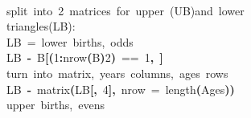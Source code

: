 \documentclass[a4paper]{article}
\newcommand{\hlnumber}[1]{\textcolor[rgb]{0.0823529411764706,0.0784313725490196,0.709803921568627}{#1}}%
\newcommand{\hlfunctioncall}[1]{\textcolor[rgb]{1,0,0}{#1}}%
\newcommand{\hlkeyword}[1]{\textcolor[rgb]{0,0,0}{\textbf{#1}}}%
\newcommand{\hlargument}[1]{\textcolor[rgb]{0.694117647058824,0.247058823529412,0.0196078431372549}{#1}}%
\newcommand{\hlcomment}[1]{\textcolor[rgb]{0.8,0.8,0.8}{#1}}%
\newcommand{\hlassignement}[1]{\textcolor[rgb]{0.215686274509804,0.215686274509804,0.384313725490196}{\textbf{#1}}}%
\newcommand{\hlsymbol}[1]{\textcolor[rgb]{0,0,0}{#1}}%
\newcommand{\hlprompt}[1]{\textcolor[rgb]{0,0,0}{#1}}%
\newcommand{\hlstd}[1]{\textcolor[rgb]{0,0,0}{#1}}%
\newenvironment{Houtput}{\raggedright}{%
%
}
\begin{document}
\begin{Houtput}
\hspace*{\fill}\\
\hlstd{}\ttfamily\noindent
\hlprompt{\usebox{\hlnormalsizeboxgreaterthan}{\ }}\hlcomment{\usebox{\hlnormalsizeboxhash}{\ }split{\ }into{\ }2{\ }matrices{\ }for{\ }upper{\ }(UB)and{\ }lower}\mbox{}
\normalfont
\hspace*{\fill}\\
\hlstd{}\ttfamily\noindent
\hlprompt{\usebox{\hlnormalsizeboxgreaterthan}{\ }}\hlcomment{\usebox{\hlnormalsizeboxhash}{\ }{\ }{\ }triangles(LB):}\mbox{}
\normalfont
\hspace*{\fill}\\
\hlstd{}\ttfamily\noindent
\hlprompt{\usebox{\hlnormalsizeboxgreaterthan}{\ }}\hlcomment{\usebox{\hlnormalsizeboxhash}{\ }LB{\ }={\ }lower{\ }births,{\ }odds}\mbox{}
\normalfont
\hspace*{\fill}\\
\hlstd{}\ttfamily\noindent
\hlprompt{\usebox{\hlnormalsizeboxgreaterthan}{\ }}\hlsymbol{LB}{\ }\hlassignement{\usebox{\hlnormalsizeboxlessthan}-}{\ }\hlsymbol{B}\hlkeyword{[}\hlkeyword{(}\hlnumber{1}\hlkeyword{:}\hlfunctioncall{nrow}\hlkeyword{(}\hlsymbol{B}\hlkeyword{)}\hlkeyword{\usebox{\hlnormalsizeboxpercent}\usebox{\hlnormalsizeboxpercent}}\hlnumber{2}\hlkeyword{)}{\ }=={\ }\hlnumber{1}\hlkeyword{,}{\ }\hlkeyword{]}\mbox{}
\normalfont
\hspace*{\fill}\\
\hlstd{}\ttfamily\noindent
\hlprompt{\usebox{\hlnormalsizeboxgreaterthan}{\ }}\hlcomment{\usebox{\hlnormalsizeboxhash}{\ }turn{\ }into{\ }matrix,{\ }years{\ }columns,{\ }ages{\ }rows}\mbox{}
\normalfont
\hspace*{\fill}\\
\hlstd{}\ttfamily\noindent
\hlprompt{\usebox{\hlnormalsizeboxgreaterthan}{\ }}\hlsymbol{LB}{\ }\hlassignement{\usebox{\hlnormalsizeboxlessthan}-}{\ }\hlfunctioncall{matrix}\hlkeyword{(}\hlsymbol{LB}\hlkeyword{[}\hlkeyword{,}{\ }\hlnumber{4}\hlkeyword{]}\hlkeyword{,}{\ }\hlargument{nrow}{\ }\hlargument{=}{\ }\hlfunctioncall{length}\hlkeyword{(}\hlsymbol{Ages}\hlkeyword{)}\hlkeyword{)}\mbox{}
\normalfont
\hspace*{\fill}\\
\hlstd{}\ttfamily\noindent
\hlprompt{\usebox{\hlnormalsizeboxgreaterthan}{\ }}\hlcomment{\usebox{\hlnormalsizeboxhash}{\ }upper{\ }births,{\ }evens}\mbox{}
\normalfont
\hspace*{\fill}\\

\end{Houtput}
\end{document}

